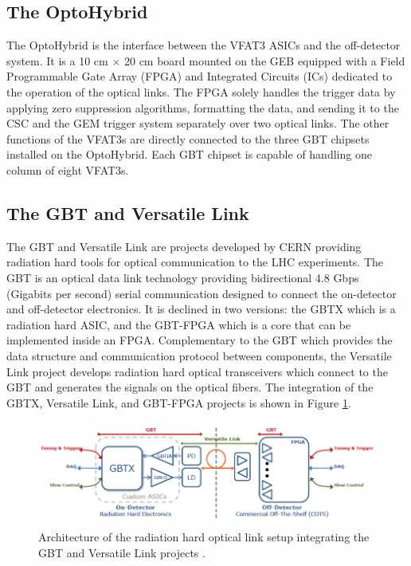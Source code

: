     \subsection{The OptoHybrid}

      The OptoHybrid is the interface between the VFAT3 ASICs and the off-detector system. It is a 10 cm $ \times $ 20 cm board mounted on the GEB equipped with a Field Programmable Gate Array (FPGA) and Integrated Circuits (ICs) dedicated to the operation of the optical links. The FPGA solely handles the trigger data by applying zero suppression algorithms, formatting the data, and sending it to the CSC and the GEM trigger system separately over two optical links. The other functions of the VFAT3s are directly connected to the three GBT chipsets installed on the OptoHybrid. Each GBT chipset is capable of handling one column of eight VFAT3s.

    \subsection{The GBT and Versatile Link}
    \label{sec:II-2-gbt}

      The GBT \cite{Moreira:1235836} and Versatile Link \cite{Soos:1609037} are projects developed by CERN providing radiation hard tools for optical communication to the LHC experiments. The GBT is an optical data link technology providing bidirectional 4.8 Gbps (Gigabits per second) serial communication designed to connect the on-detector and off-detector electronics. It is declined in two versions: the GBTX which is a radiation hard ASIC, and the GBT-FPGA which is a core that can be implemented inside an FPGA. Complementary to the GBT which provides the data structure and communication protocol between components, the Versatile Link project develops radiation hard optical transceivers which connect to the GBT and generates the signals on the optical fibers. The integration of the GBTX, Versatile Link, and GBT-FPGA projects is shown in Figure \ref{fig:II-2-gbt-versatile}. \\

      \begin{figure}[h!]
        \centering
        \includegraphics[width=\textwidth]{img/II-2-daq/gbt-versatile.pdf}
        \caption{Architecture of the radiation hard optical link setup integrating the GBT and Versatile Link projects \cite{Moreira:1235836}.}
        \label{fig:II-2-gbt-versatile}
      \end{figure}

